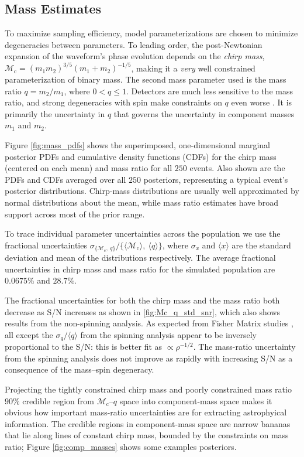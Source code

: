\subsection{Mass Estimates}\label{sec:mass}
To maximize sampling efficiency, model parameterizations are chosen to minimize degeneracies between parameters.  To leading order, the post-Newtonian expansion of the waveform's phase evolution depends on the \emph{chirp mass}, $\mathcal{M}_\mathrm{c} = (m_1 m_2)^{3/5} (m_1 + m_2)^{-1/5}$, making it a \emph{very} well constrained parameterization of binary mass.  The second mass parameter used is the mass ratio $q = m_2/m_1$, where $0 < q \leq 1$.  Detectors are much less sensitive to the mass ratio, and strong degeneracies with spin make constraints on $q$ even worse \citep{Cutler_1994}.  It is primarily the uncertainty in $q$ that governs the uncertainty in component masses $m_1$ and $m_2$.

Figure \ref{fig:mass_pdfs} shows the superimposed, one-dimensional marginal posterior PDFs and cumulative density functions (CDFs) for the chirp mass (centered on each mean) and mass ratio for all $250$ events.  Also shown are the PDFs and CDFs averaged over all $250$ posteriors, representing a typical event's posterior distributions.  Chirp-mass distributions are usually well approximated by normal distributions about the mean, while mass ratio estimates have broad support across most of the prior range.

To trace individual parameter uncertainties across the population we use the fractional uncertainties $\sigma_{\{\mathcal{M}_\mathrm{c},~q\}}/\{\langle\mathcal{M}_\mathrm{c}\rangle,~\langle q\rangle\}$, where $\sigma_x$ and $\langle x\rangle$ are the standard deviation and mean of the distributions respectively. The average fractional uncertainties in chirp mass and mass ratio for the simulated population are $0.0675\%$ and $28.7\%$.

The fractional uncertainties for both the chirp mass and the mass ratio both decrease as S/N increases as shown in \ref{fig:Mc_q_std_snr}, which also shows results from the non-spinning analysis. As expected from Fisher Matrix studies \citep[e.g.,]{FinnChernoff}, all except the $\sigma_q/\langle q\rangle$ from the spinning analysis appear to be inversely proportional to the S/N: this is better fit as $\propto \rho^{-1/2}$. The mass-ratio uncertainty from the spinning analysis does not improve as rapidly with increasing S/N as a consequence of the mass--spin degeneracy.
  
Projecting the tightly constrained chirp mass and poorly constrained mass ratio $90\%$ credible region from $\mathcal{M}_\mathrm{c}$--$q$ space into component-mass space makes it obvious how important mass-ratio uncertainties are for extracting astrophyical information.  The credible regions in component-mass space are narrow bananas that lie along lines of constant chirp mass, bounded by the constraints on mass ratio; Figure \ref{fig:comp_masses} shows some examples posteriors.
  
  
  
  
  
  
  
  
  
  
  
  